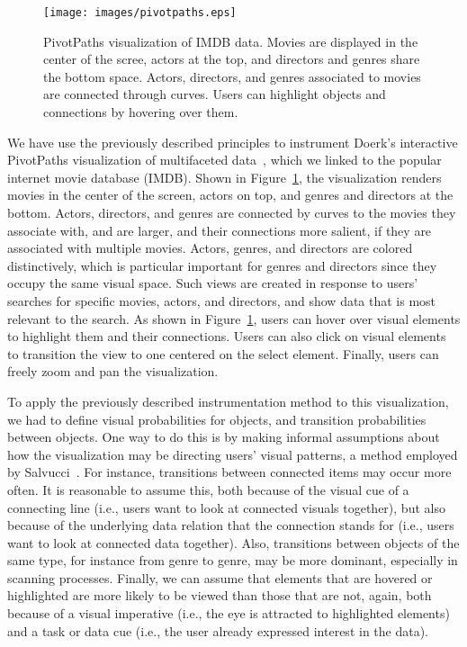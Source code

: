 \begin{figure}[htb]
  \centering
  \texttt{[image: images/pivotpaths.eps]}
  \caption{PivotPaths visualization of IMDB data. Movies are displayed in the center of the scree, actors at the top, and directors and genres share the bottom space. Actors, directors, and genres associated to movies are connected through curves. Users can highlight objects and connections by hovering over them.}
	\label{fig:pivotpaths}
\end{figure}
We have use the previously described principles to instrument Doerk's interactive PivotPaths visualization of multifaceted data~\cite{dork2012pivotpaths}, which we linked to the popular internet movie database (IMDB). Shown in Figure~\ref{fig:pivotpaths}, the visualization renders movies in the center of the screen, actors on top, and genres and directors at the bottom. Actors, directors, and genres are connected by curves to the movies they associate with, and are larger, and their connections more salient, if they are associated with multiple movies. Actors, genres, and directors are colored distinctively, which is particular important for genres and directors since they occupy the same visual space. Such views are created in response to users' searches for specific movies, actors, and directors, and show data that is most relevant to the search. As shown in Figure~\ref{fig:pivotpaths}, users can hover over visual elements to highlight them and their connections. Users can also click on visual elements to transition the view to one centered on the select element. Finally, users can freely zoom and pan the visualization. 

To apply the previously described instrumentation method to this visualization, we had to define visual probabilities for objects, and transition probabilities between objects. One way to do this is by making informal assumptions about how the visualization may be directing users' visual patterns, a method employed by Salvucci~\cite{salvucci2000intelligent}. For instance, transitions between connected items may occur more often. It is reasonable to assume this, both because of the visual cue of a connecting line (i.e., users want to look at connected visuals together), but also because of the underlying data relation that the connection stands for (i.e., users want to look at connected data together). Also, transitions between objects of the same type, for instance from genre to genre, may be more dominant, especially in scanning processes. Finally, we can assume that elements that are hovered or highlighted are more likely to be viewed than those that are not, again, both because of a visual imperative (i.e., the eye is attracted to highlighted elements) and a task or data cue (i.e., the user already expressed interest in the data).

